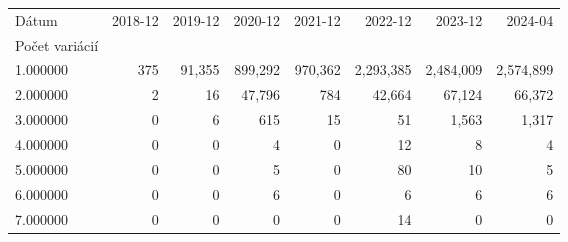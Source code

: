 \begin{tabular}{lrrrrrrr}
\toprule
Dátum & 2018-12 & 2019-12 & 2020-12 & 2021-12 & 2022-12 & 2023-12 & 2024-04 \\
Počet variácií &  &  &  &  &  &  &  \\
\midrule
1.000000 & 375 & 91,355 & 899,292 & 970,362 & 2,293,385 & 2,484,009 & 2,574,899 \\
2.000000 & 2 & 16 & 47,796 & 784 & 42,664 & 67,124 & 66,372 \\
3.000000 & 0 & 6 & 615 & 15 & 51 & 1,563 & 1,317 \\
4.000000 & 0 & 0 & 4 & 0 & 12 & 8 & 4 \\
5.000000 & 0 & 0 & 5 & 0 & 80 & 10 & 5 \\
6.000000 & 0 & 0 & 6 & 0 & 6 & 6 & 6 \\
7.000000 & 0 & 0 & 0 & 0 & 14 & 0 & 0 \\
\bottomrule
\end{tabular}
